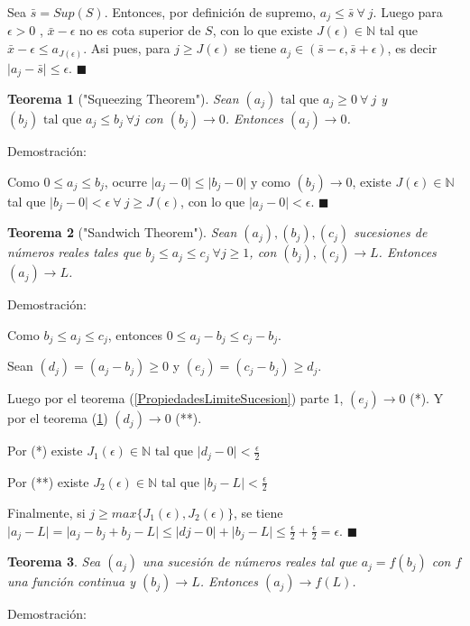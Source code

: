 \documentclass[12pt]{book}
\newcommand\N{{\mathbb N}}
\providecommand{\abs}[1]{\lvert#1\rvert}
\newtheorem{teo}{Teorema}[section]
\begin{document}
Sea $\bar{s}=Sup(S)$. Entonces, por definición de supremo, $a_j \le \bar{s} \ \forall \ j$. Luego para $\epsilon >0$ , $\bar{x}-\epsilon$ no es cota superior de $S$, con lo que existe $J(\epsilon) \in \N$ tal que $\bar{x}-\epsilon \le a_{J(\epsilon)}$. Asi pues, para $j \ge J(\epsilon)$ se tiene $a_j \in (\bar{s}-\epsilon,\bar{s}+\epsilon)$, es decir $\abs{a_j-\bar{s}} \le \epsilon$. $\blacksquare$

\begin{teo}["Squeezing Theorem"]\rm\label{squeezing}
Sean $(a_j) \mbox{ tal que } a_j \ge 0 \ \forall \ j$ y $(b_j) \mbox{ tal que } a_j \le b_j \ \forall j$ con $(b_j) \rightarrow 0$.
Entonces $(a_j) \rightarrow 0$.
\end{teo}
Demostración:

Como $0 \le a_j \le b_j$, ocurre $\abs{a_j-0} \le \abs{b_j-0} \mbox{ y como } (b_j) \rightarrow 0$, existe $J(\epsilon) \in \N$ tal que $\abs{b_j-0}<\epsilon \ \forall \ j \ge J(\epsilon)$, con lo que $\abs{a_j-0}<\epsilon$. $\blacksquare$
\begin{teo}["Sandwich Theorem"]\rm
Sean $(a_j),(b_j),(c_j)$ sucesiones de números reales tales que $b_j \le a_j \le c_j \ \forall j\ge 1$, con $(b_j),(c_j) \rightarrow L$. Entonces $(a_j) \rightarrow L$.
\end{teo}
Demostración:

Como $b_j \le a_j \le c_j$, entonces $0 \le a_j-b_j \le c_j-b_j$.

Sean $(d_j)=(a_j-b_j) \ge 0$ y $(e_j)=(c_j-b_j) \ge d_j$.

Luego por el teorema (\ref{PropiedadesLimiteSucesion}) parte 1, $(e_j) \rightarrow 0$ (*). Y por el teorema (\ref{squeezing}) $(d_j) \rightarrow 0$ (**).

Por (*) existe $J_1(\epsilon) \in \N \mbox{ tal que } \abs{d_j-0}<\frac{\epsilon}{2}$

Por (**) existe $J_2(\epsilon) \in \N \mbox{ tal que } \abs{b_j-L}<\frac{\epsilon}{2}$

Finalmente, si $j \ge max\{J_1(\epsilon),J_2(\epsilon)\}$, se tiene  $\abs{a_j-L}=\abs{a_j-b_j+b_j-L} \le \abs{dj-0}+\abs{b_j-L} \le \frac{\epsilon}{2}+\frac{\epsilon}{2}=\epsilon$. $\blacksquare$

\begin{teo}\rm
Sea $(a_j)$ una sucesión de números reales tal que $a_j=f(b_j)$ con $f$ una función continua y $(b_j) \rightarrow L$. Entonces $(a_j) \rightarrow f(L)$.
\end{teo}
Demostración:
\end{document}
